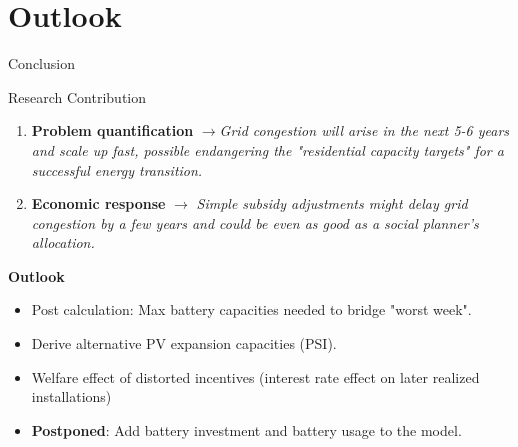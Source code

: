 \documentclass[10pt, aspectratio=169]{beamer}
\begin{document}
\section{Outlook}

\begin{frame}{Conclusion}

  \begin{block}{Research Contribution}
    \begin{enumerate}
      \item \textbf{Problem quantification} $\rightarrow$\textit{Grid congestion will arise in the next 5-6 years and scale up fast, possible endangering the "residential capacity targets" for a successful energy transition.}
      \vspace{-0.05cm}
      \item \textbf{Economic response} $\rightarrow$ \textit{Simple subsidy adjustments might delay grid congestion by a few years and could be even as good as a social planner's allocation.}
    \end{enumerate}
  \end{block}

  \textbf{Outlook}
  \vspace{-0.1cm}
  \begin{itemize}
    \item Post calculation: Max battery capacities needed to bridge "worst week".
    \item Derive alternative PV expansion capacities (PSI).
    \item Welfare effect of distorted incentives (interest rate effect on later realized installations)
    \item \textbf{Postponed}: Add battery investment and battery usage to the model.
  \end{itemize}


\end{frame}
\end{document}
